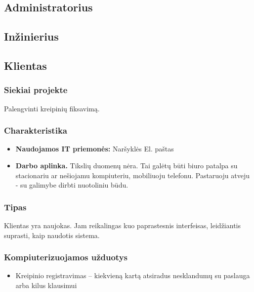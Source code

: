 			
	
	\subsection{Administratorius}
	
	\subsection{Inžinierius}
	
	\subsection{Klientas}
			
		\subsubsection{Siekiai projekte}
		
		Palengvinti kreipinių fiksavimą.
		
		\subsubsection{Charakteristika}
		
		\begin{itemize}
			\item \textbf{Naudojamos IT priemonės:}
				\subitem Naršyklės
				\subitem El. paštas
			\item \textbf{Darbo aplinka.} Tikslių duomenų nėra. 
			Tai galėtų būti biuro patalpa su stacionariu ar nešiojamu kompiuteriu, mobiliuoju telefonu.
			Pastaruoju atveju - su galimybe dirbti nuotoliniu būdu.
		\end{itemize}
			
		\subsubsection{Tipas}
		
		Klientas yra naujokas. Jam reikalingas kuo paprastesnis interfeisas, leidžiantis suprasti, kaip naudotis sistema.
		
		\subsubsection{Kompiuterizuojamos užduotys}
		
		\begin{itemize}
			\item Kreipinio registravimas – kiekvieną kartą atsiradus nesklandumų su paslauga arba kilus klausimui
		\end{itemize}
		
